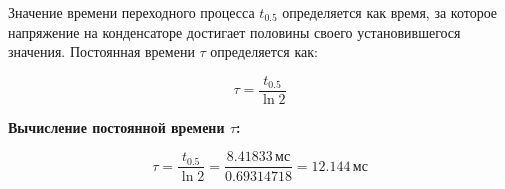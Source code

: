 




















Значение времени переходного процесса \( t_{0.5} \) определяется как время, за которое напряжение на конденсаторе достигает половины своего установившегося значения. Постоянная времени \( \tau \) определяется как:

\[
	\tau = \frac{t_{0.5}}{\ln 2}
\]

\textbf{Вычисление постоянной времени \( \tau \):}

\[
	\tau = \frac{t_{0.5}}{\ln 2} = \frac{8.41833 \, \text{мс}}{0.69314718} = 12.144 \, \text{мс}
\]
